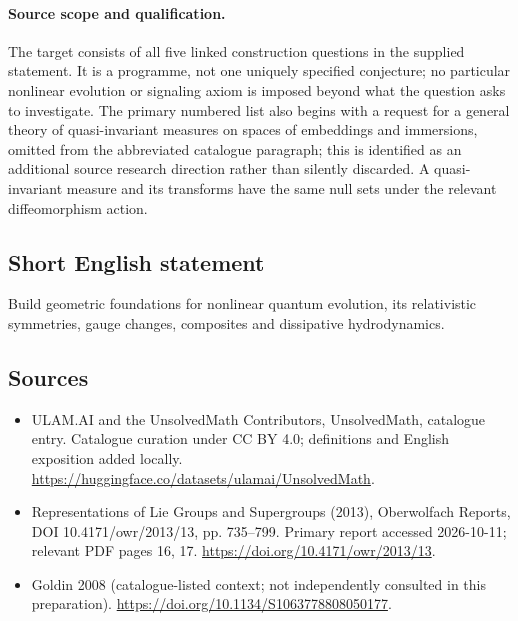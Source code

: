 \documentclass[11pt]{article}
\begin{document}
\paragraph{Source scope and qualification.}
The target consists of all five linked construction questions in the supplied statement. It is a programme, not one uniquely specified conjecture; no particular nonlinear evolution or signaling axiom is imposed beyond what the question asks to investigate. The primary numbered list also begins with a request for a general theory of quasi-invariant measures on spaces of embeddings and immersions, omitted from the abbreviated catalogue paragraph; this is identified as an additional source research direction rather than silently discarded. A quasi-invariant measure and its transforms have the same null sets under the relevant diffeomorphism action.
\subsection{Short English statement}
Build geometric foundations for nonlinear quantum evolution, its relativistic symmetries, gauge changes, composites and dissipative hydrodynamics.
\subsection{Sources}
\begin{itemize}
\item[\hypertarget{source:statement:1}{S1}] ULAM.AI and the UnsolvedMath Contributors, UnsolvedMath, catalogue entry. Catalogue curation under CC BY 4.0; definitions and English exposition added locally.
\url{https://huggingface.co/datasets/ulamai/UnsolvedMath}.
\item[\hypertarget{source:statement:2}{S2}] Representations of Lie Groups and Supergroups (2013), Oberwolfach Reports, DOI 10.4171/owr/2013/13, pp. 735--799. Primary report accessed 2026-10-11; relevant PDF pages 16, 17.
\url{https://doi.org/10.4171/owr/2013/13}.
\item[\hypertarget{source:statement:3}{S3}] Goldin 2008 (catalogue-listed context; not independently consulted in this preparation).
\url{https://doi.org/10.1134/S1063778808050177}.
\end{itemize}
\label{end:statement}
\end{document}
